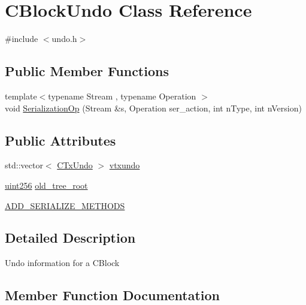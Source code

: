 \hypertarget{class_c_block_undo}{}\section{C\+Block\+Undo Class Reference}
\label{class_c_block_undo}


{\ttfamily \#include $<$undo.\+h$>$}

\subsection*{Public Member Functions}
\begin{DoxyCompactItemize}
\item 
{\footnotesize template$<$typename Stream , typename Operation $>$ }\\void \mbox{\hyperlink{class_c_block_undo_ad4d50e2b34e291dbe2d15fbe3ae3670b}{Serialization\+Op}} (Stream \&s, Operation ser\+\_\+action, int n\+Type, int n\+Version)
\end{DoxyCompactItemize}
\subsection*{Public Attributes}
\begin{DoxyCompactItemize}
\item 
std\+::vector$<$ \mbox{\hyperlink{class_c_tx_undo}{C\+Tx\+Undo}} $>$ \mbox{\hyperlink{class_c_block_undo_ad0baf7a4d3634b27b4affac2e7cf75c9}{vtxundo}}
\item 
\mbox{\hyperlink{classuint256}{uint256}} \mbox{\hyperlink{class_c_block_undo_ae4097ec58b3c6b7c0d6c574207ff0f2e}{old\+\_\+tree\+\_\+root}}
\item 
\mbox{\hyperlink{class_c_block_undo_a4fecc9723902f51e25b57e2e2d45334a}{A\+D\+D\+\_\+\+S\+E\+R\+I\+A\+L\+I\+Z\+E\+\_\+\+M\+E\+T\+H\+O\+DS}}
\end{DoxyCompactItemize}


\subsection{Detailed Description}
Undo information for a C\+Block 

\subsection{Member Function Documentation}
\mbox{\label{class_c_block_undo_ad4d50e2b34e291dbe2d15fbe3ae3670b}} 
